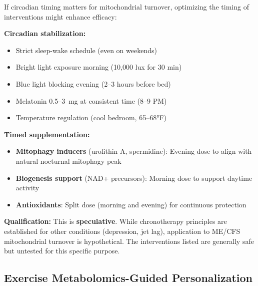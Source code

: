 \begin{speculation}
If circadian timing matters for mitochondrial turnover, optimizing the timing of interventions might enhance efficacy:

\textbf{Circadian stabilization:}
\begin{itemize}
    \item Strict sleep-wake schedule (even on weekends)
    \item Bright light exposure morning (10,000 lux for 30 min)
    \item Blue light blocking evening (2--3 hours before bed)
    \item Melatonin 0.5--3~mg at consistent time (8--9 PM)
    \item Temperature regulation (cool bedroom, 65--68°F)
\end{itemize}

\textbf{Timed supplementation:}
\begin{itemize}
    \item \textbf{Mitophagy inducers} (urolithin A, spermidine): Evening dose to align with natural nocturnal mitophagy peak
    \item \textbf{Biogenesis support} (NAD+ precursors): Morning dose to support daytime activity
    \item \textbf{Antioxidants}: Split dose (morning and evening) for continuous protection
\end{itemize}

\textbf{Qualification:} This is \textbf{speculative}. While chronotherapy principles are established for other conditions (depression, jet lag), application to ME/CFS mitochondrial turnover is hypothetical. The interventions listed are generally safe but untested for this specific purpose.
\end{speculation}

\subsection{Exercise Metabolomics-Guided Personalization}
\label{subsec:metabolomics-personalization}

